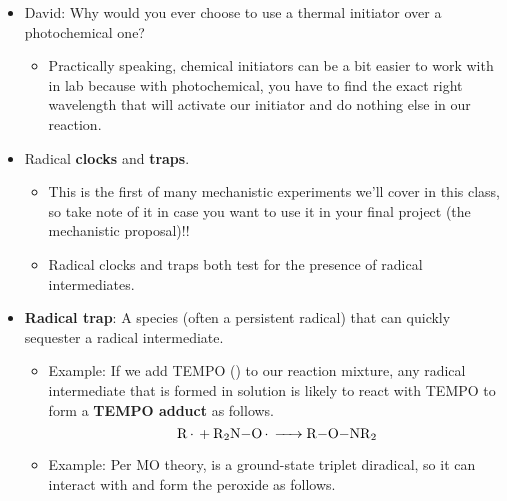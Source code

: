 \documentclass[../notes.tex]{subfiles}
\begin{document}
\begin{itemize}
\begin{figure}[h!]
        \schemestop
        \caption{Barton-McCombie deoxygenation.}
        \label{fig:BartonDeox}
    \end{figure}
    \begin{itemize}
        \item Masha wanted to include this one named reaction, even though named reactions are not our focus in this class.
        \item Essentially, we react an alcohol to form a xanthate ester and then cleave it off with radicals.\footnote{See 5.47 notes for a mechanism.}
    \end{itemize}
    \item David: Why would you ever choose to use a thermal initiator over a photochemical one?
    \begin{itemize}
        \item Practically speaking, chemical initiators can be a bit easier to work with in lab because with photochemical, you have to find the exact right wavelength that will activate our initiator and do nothing else in our reaction.
    \end{itemize}
    \item Radical \textbf{clocks} and \textbf{traps}.
    \begin{itemize}
        \item This is the first of many mechanistic experiments we'll cover in this class, so take note of it in case you want to use it in your final project (the mechanistic proposal)!!
        \item Radical clocks and traps both test for the presence of radical intermediates.
    \end{itemize}
    \item \textbf{Radical trap}: A species (often a persistent radical) that can quickly sequester a radical intermediate.
    \begin{itemize}
        \item Example: If we add TEMPO () to our reaction mixture, any radical intermediate  that is formed in solution is likely to react with TEMPO to form a \textbf{TEMPO adduct} as follows.
        \begin{equation*}
            \ce{R* + R2N-O* -> R-O-NR2}
        \end{equation*}
        \item Example: Per MO theory,  is a ground-state triplet diradical, so it can interact with  and form the peroxide as follows.
        \begin{center}

\end{center}
\end{itemize}
\end{itemize}
\end{document}
